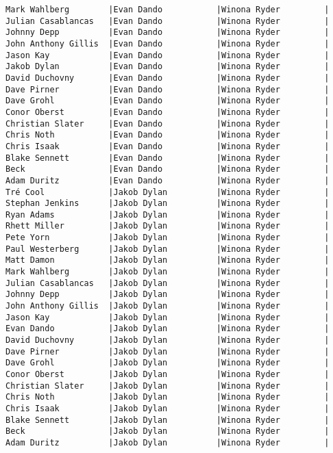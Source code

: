 \documentclass{article}
\begin{document}
\begin{verbatim}
Mark Wahlberg        |Evan Dando           |Winona Ryder         |
Julian Casablancas   |Evan Dando           |Winona Ryder         |
Johnny Depp          |Evan Dando           |Winona Ryder         |
John Anthony Gillis  |Evan Dando           |Winona Ryder         |
Jason Kay            |Evan Dando           |Winona Ryder         |
Jakob Dylan          |Evan Dando           |Winona Ryder         |
David Duchovny       |Evan Dando           |Winona Ryder         |
Dave Pirner          |Evan Dando           |Winona Ryder         |
Dave Grohl           |Evan Dando           |Winona Ryder         |
Conor Oberst         |Evan Dando           |Winona Ryder         |
Christian Slater     |Evan Dando           |Winona Ryder         |
Chris Noth           |Evan Dando           |Winona Ryder         |
Chris Isaak          |Evan Dando           |Winona Ryder         |
Blake Sennett        |Evan Dando           |Winona Ryder         |
Beck                 |Evan Dando           |Winona Ryder         |
Adam Duritz          |Evan Dando           |Winona Ryder         |
Tré Cool             |Jakob Dylan          |Winona Ryder         |
Stephan Jenkins      |Jakob Dylan          |Winona Ryder         |
Ryan Adams           |Jakob Dylan          |Winona Ryder         |
Rhett Miller         |Jakob Dylan          |Winona Ryder         |
Pete Yorn            |Jakob Dylan          |Winona Ryder         |
Paul Westerberg      |Jakob Dylan          |Winona Ryder         |
Matt Damon           |Jakob Dylan          |Winona Ryder         |
Mark Wahlberg        |Jakob Dylan          |Winona Ryder         |
Julian Casablancas   |Jakob Dylan          |Winona Ryder         |
Johnny Depp          |Jakob Dylan          |Winona Ryder         |
John Anthony Gillis  |Jakob Dylan          |Winona Ryder         |
Jason Kay            |Jakob Dylan          |Winona Ryder         |
Evan Dando           |Jakob Dylan          |Winona Ryder         |
David Duchovny       |Jakob Dylan          |Winona Ryder         |
Dave Pirner          |Jakob Dylan          |Winona Ryder         |
Dave Grohl           |Jakob Dylan          |Winona Ryder         |
Conor Oberst         |Jakob Dylan          |Winona Ryder         |
Christian Slater     |Jakob Dylan          |Winona Ryder         |
Chris Noth           |Jakob Dylan          |Winona Ryder         |
Chris Isaak          |Jakob Dylan          |Winona Ryder         |
Blake Sennett        |Jakob Dylan          |Winona Ryder         |
Beck                 |Jakob Dylan          |Winona Ryder         |
Adam Duritz          |Jakob Dylan          |Winona Ryder         |

\end{verbatim}
\end{document}
